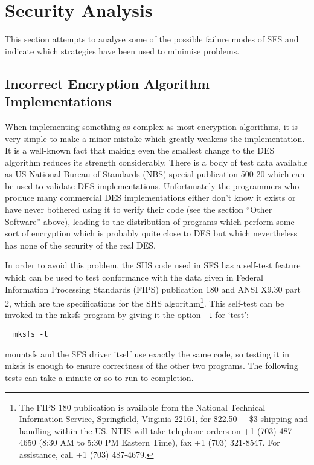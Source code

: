 \section{Security Analysis}

This section attempts to analyse some of the possible failure modes of SFS and
indicate which strategies have been used to minimise problems.


\subsection{Incorrect Encryption Algorithm Implementations}

When implementing something as complex as most encryption algorithms, it is
very simple to make a minor mistake which greatly weakens the implementation.
It is a well-known fact that making even the smallest change to the DES
algorithm reduces its strength considerably.  There is a body of test data
available as US National Bureau of Standards (NBS) special publication 500-20
which can be used to validate DES implementations.  Unfortunately the
programmers who produce many commercial DES implementations either don't know
it exists or have never bothered using it to verify their code (see the section
``Other Software'' above), leading to the distribution of programs which perform
some sort of encryption which is probably quite close to DES but which
nevertheless has none of the security of the real DES.

In order to avoid this problem, the SHS code used in SFS has a self-test
feature which can be used to test conformance with the data given in Federal
Information Processing Standards (FIPS) publication 180 and ANSI X9.30 part 2, 
which are the specifications for the SHS algorithm\footnote{
		The FIPS 180 publication is available from the National Technical
              	Information Service, Springfield, Virginia 22161, for \$22.50 + \$3
              	shipping and handling within the US.  NTIS will take telephone
              	orders on +1 (703) 487-4650 (8:30 AM to 5:30 PM Eastern Time),
              	fax +1 (703) 321-8547.  For assistance, call +1 (703) 487-4679.
}.  This self-test can be 
invoked in the mksfs program by giving it the option {\tt -t} for `test':

{\tt  \verb|  |mksfs -t}

mountsfs and the SFS driver itself use exactly the same code, so testing it in
mksfs is enough to ensure correctness of the other two programs.  The following
tests can take a minute or so to run to completion.

